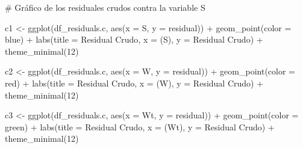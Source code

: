 \documentclass[
  letterpaper,
  DIV=11,
  numbers=noendperiod]{scrartcl}
\newenvironment{Shaded}{\begin{snugshade}}{\end{snugshade}}
\newcommand{\AttributeTok}[1]{\textcolor[rgb]{0.40,0.45,0.13}{#1}}
\newcommand{\CommentTok}[1]{\textcolor[rgb]{0.37,0.37,0.37}{#1}}
\newcommand{\DecValTok}[1]{\textcolor[rgb]{0.68,0.00,0.00}{#1}}
\newcommand{\FunctionTok}[1]{\textcolor[rgb]{0.28,0.35,0.67}{#1}}
\newcommand{\NormalTok}[1]{\textcolor[rgb]{0.00,0.23,0.31}{#1}}
\newcommand{\OtherTok}[1]{\textcolor[rgb]{0.00,0.23,0.31}{#1}}
\newcommand{\SpecialCharTok}[1]{\textcolor[rgb]{0.37,0.37,0.37}{#1}}
\newcommand{\StringTok}[1]{\textcolor[rgb]{0.13,0.47,0.30}{#1}}
\begin{document}
\begin{Shaded}
\begin{Highlighting}[]
\CommentTok{\# Gráfico de los residuales crudos contra la variable S}

\NormalTok{c1 }\OtherTok{\textless{}{-}} \FunctionTok{ggplot}\NormalTok{(df\_residuals.c, }\FunctionTok{aes}\NormalTok{(}\AttributeTok{x =}\NormalTok{ S, }\AttributeTok{y =}\NormalTok{ residual)) }\SpecialCharTok{+}
    \FunctionTok{geom\_point}\NormalTok{(}\AttributeTok{color =} \StringTok{\textquotesingle{}blue\textquotesingle{}}\NormalTok{) }\SpecialCharTok{+}
    \FunctionTok{labs}\NormalTok{(}\AttributeTok{title =} \StringTok{\textquotesingle{}Residual Crudo\textquotesingle{}}\NormalTok{, }\AttributeTok{x =} \StringTok{\textquotesingle{}(S)\textquotesingle{}}\NormalTok{, }\AttributeTok{y =} \StringTok{\textquotesingle{}Residual Crudo\textquotesingle{}}\NormalTok{) }\SpecialCharTok{+}
    \FunctionTok{theme\_minimal}\NormalTok{(}\DecValTok{12}\NormalTok{)}

\NormalTok{c2 }\OtherTok{\textless{}{-}} \FunctionTok{ggplot}\NormalTok{(df\_residuals.c, }\FunctionTok{aes}\NormalTok{(}\AttributeTok{x =}\NormalTok{ W, }\AttributeTok{y =}\NormalTok{ residual)) }\SpecialCharTok{+}
    \FunctionTok{geom\_point}\NormalTok{(}\AttributeTok{color =} \StringTok{\textquotesingle{}red\textquotesingle{}}\NormalTok{) }\SpecialCharTok{+}
    \FunctionTok{labs}\NormalTok{(}\AttributeTok{title =} \StringTok{\textquotesingle{}Residual Crudo\textquotesingle{}}\NormalTok{, }\AttributeTok{x =} \StringTok{\textquotesingle{}(W)\textquotesingle{}}\NormalTok{, }\AttributeTok{y =} \StringTok{\textquotesingle{}Residual Crudo\textquotesingle{}}\NormalTok{) }\SpecialCharTok{+}
    \FunctionTok{theme\_minimal}\NormalTok{(}\DecValTok{12}\NormalTok{)}

\NormalTok{c3 }\OtherTok{\textless{}{-}} \FunctionTok{ggplot}\NormalTok{(df\_residuals.c, }\FunctionTok{aes}\NormalTok{(}\AttributeTok{x =}\NormalTok{ Wt, }\AttributeTok{y =}\NormalTok{ residual)) }\SpecialCharTok{+}
    \FunctionTok{geom\_point}\NormalTok{(}\AttributeTok{color =} \StringTok{\textquotesingle{}green\textquotesingle{}}\NormalTok{) }\SpecialCharTok{+}
    \FunctionTok{labs}\NormalTok{(}\AttributeTok{title =} \StringTok{\textquotesingle{}Residual Crudo\textquotesingle{}}\NormalTok{, }\AttributeTok{x =} \StringTok{\textquotesingle{}(Wt)\textquotesingle{}}\NormalTok{, }\AttributeTok{y =} \StringTok{\textquotesingle{}Residual Crudo\textquotesingle{}}\NormalTok{) }\SpecialCharTok{+}
    \FunctionTok{theme\_minimal}\NormalTok{(}\DecValTok{12}\NormalTok{)}


\end{Highlighting}
\end{Shaded}
\end{document}
